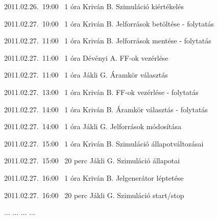 \begin{naplo}
\bejegyzes
{2011.02.26.~19:00~} %
{1 óra} %
{Kriván B.} %
{Szimuláció kiértékelés} %

\bejegyzes
{2011.02.27.~10:00~} %
{1 óra} %
{Kriván B.} %
{Jelforrások betöltése - folytatás} %

\bejegyzes
{2011.02.27.~11:00~} %
{1 óra} %
{Kriván B.} %
{Jelforrások mentése - folytatás} %

\bejegyzes
{2011.02.27.~11:00~} %
{1 óra} %
{Dévényi A.} %
{FF-ok vezérlése} %

\bejegyzes
{2011.02.27.~11:00~} %
{1 óra} %
{Jákli G.} %
{Áramkör választás} %

\bejegyzes
{2011.02.27.~13:00~} %
{1 óra} %
{Kriván B.} %
{FF-ok vezérlése - folytatás} %

\bejegyzes
{2011.02.27.~14:00~} %
{1 óra} %
{Kriván B.} %
{Áramkör választás - folytatás} %

\bejegyzes
{2011.02.27.~14:00~} %
{1 óra} %
{Jákli G.} %
{Jelforrások módosítása} %

\bejegyzes
{2011.02.27.~15:00~} %
{1 óra} %
{Kriván B.} %
{Szimuláció állapotváltozásai} %

\bejegyzes
{2011.02.27.~15:00~} %
{20 perc} %
{Jákli G.} %
{Szimuláció állapotai} %

\bejegyzes
{2011.02.27.~16:00~} %
{1 óra} %
{Kriván B.} %
{Jelgenerátor léptetése} %

\bejegyzes
{2011.02.27.~16:00~} %
{20 perc} %
{Jákli G.} %
{Szimuláció start/stop} %


\bejegyzes
{...}
{...}
{...}
{...}


\end{naplo}

